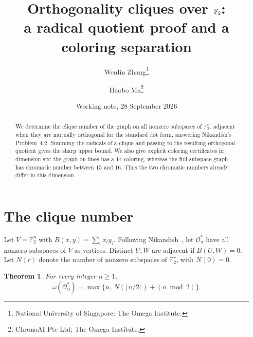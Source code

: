 \documentclass[11pt]{article}
\title{Orthogonality cliques over $\F$:\\a radical quotient proof and a coloring separation}
\author{Wenlin Zhang\thanks{National University of Singapore; The Omega Institute.}
\and Haobo Ma\thanks{ChronoAI Pte Ltd; The Omega Institute.}}
\date{Working note, 28 September 2026}
\newtheorem{theorem}{Theorem}
\newcommand{\F}{\mathbb F_2}
\newcommand{\Oc}{\mathcal O}
\begin{document}
\maketitle
\begin{abstract}
We determine the clique number of the graph on all nonzero subspaces of
$\F^n$, adjacent when they are mutually orthogonal for the standard dot
form, answering Nikandish's Problem~4.2. Summing the radicals of a clique
and passing to the resulting orthogonal quotient gives the sharp upper
bound. We also give explicit coloring certificates in dimension six:
the graph on lines has a $14$-coloring, whereas the full subspace graph
has chromatic number between $15$ and $16$. Thus the two chromatic numbers
already differ in this dimension.
\end{abstract}

\section{The clique number}

Let $V=\F^n$ with $B(x,y)=\sum_i x_i y_i$. Following Nikandish~\cite{N},
let $\Oc_n^*$ have all nonzero subspaces of $V$ as vertices. Distinct
$U,W$ are adjacent if $B(U,W)=0$. Let $N(r)$ denote the number of nonzero
subspaces of $\F^r$, with $N(0)=0$.

\begin{theorem}\label{thm:clique}
For every integer $n\ge1$,
\[
 \omega(\Oc_n^*)=\max\{n,\ N(\lfloor n/2\rfloor)+(n\bmod2)\}.
\]
\end{theorem}
\end{document}
